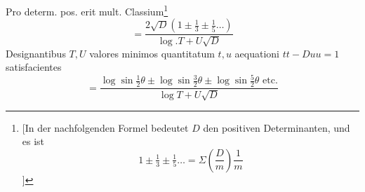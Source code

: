 Pro determ. pos. erit mult. Classium\begingroup\renewcommand{\thefootnote}{**)}\footnote{[In der nachfolgenden Formel bedeutet $D$ den positiven Determinanten, und es ist
\[
1\pm\tfrac13\pm\tfrac15\ldots=\Sigma\left(\frac Dm\right)\frac1m
\]
]}\endgroup
\[
=\frac{2\surd D(1\pm\tfrac13\pm\tfrac15\ldots)}{\log .T+U\surd D}
\]
Designantibus $T,U$ valores minimos quantitatum $t,u$ aequationi $tt-Duu=1$ satisfacientes
\[
=\frac{\log\sin\tfrac12\theta\pm\log\sin\tfrac32\theta\pm\log\sin\tfrac52\theta\text{ etc.}}{\log T+U\surd D}
\]
